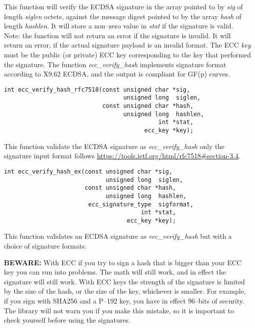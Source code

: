 \documentclass[synpaper]{book}
\begin{document}
This function will verify the ECDSA signature in the array pointed to by \textit{sig} of length \textit{siglen} octets, against the message digest
pointed to by the array \textit{hash} of length \textit{hashlen}. It will store a non--zero value in \textit{stat} if the signature is valid.  Note:
the function will not return an error if the signature is invalid. It will return an error, if the actual signature payload is an invalid format.
The ECC \textit{key} must be the public (or private) ECC key corresponding to the key that performed the signature.
The function \textit{ecc\_verify\_hash} implements signature format according to X9.62 ECDSA, and the output is compliant for GF(p) curves.

\begin{verbatim}
int ecc_verify_hash_rfc7518(const unsigned char *sig,
                                  unsigned long  siglen,
                            const unsigned char *hash,
                                  unsigned long  hashlen,
                                            int *stat,
                                        ecc_key *key);
\end{verbatim}

This function validate the ECDSA signature as \textit{ecc\_verify\_hash} only the signature input format
follows \url{https://tools.ietf.org/html/rfc7518#section-3.4}.

\begin{verbatim}
int ecc_verify_hash_ex(const unsigned char *sig,
                             unsigned long  siglen,
                       const unsigned char *hash,
                             unsigned long  hashlen,
                        ecc_signature_type  sigformat,
                                       int *stat,
                                   ecc_key *key);
\end{verbatim}

This function validates an ECDSA signature as \textit{ecc\_verify\_hash} but with a choice of signature formats.

{\bf BEWARE:} With ECC if you try to sign a hash that is bigger than your ECC key you can run into problems. The math
will still work, and in effect the signature will still work.  With ECC keys the strength of the signature is limited
by the size of the hash, or the size of the key, whichever is smaller.  For example, if you sign with SHA256 and a
P--192 key, you have in effect 96--bits of security. The library will not warn you if you make this mistake, so it
is important to check yourself before using the signatures.
\end{document}
